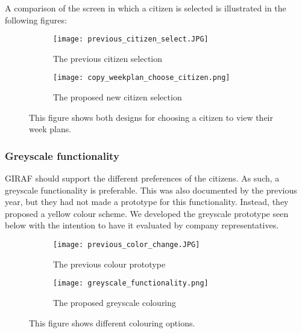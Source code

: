 A comparison of the screen in which a citizen is selected is illustrated in the following figures:
\begin{figure}[H]
    \begin{subfigure}{0.5\textwidth}
    \texttt{[image: previous\_citizen\_select.JPG]} 
    \caption{The previous citizen selection}
    \label{fig:previous_citizen_select}
    \end{subfigure}
    \begin{subfigure}{0.5\textwidth}
        \texttt{[image: copy\_weekplan\_choose\_citizen.png]}
    \caption{The proposed new citizen selection}
    \label{fig:new_citizen_select}
    \end{subfigure} 
    \caption{This figure shows both designs for choosing a citizen to view their week plans.}
    \label{fig:citizen_select}
\end{figure}
\noindent

\subsubsection{Greyscale functionality}
GIRAF should support the different preferences of the citizens. 
As such, a greyscale functionality is preferable.
This was also documented by the previous year, but they had not made a prototype for this functionality.
Instead, they proposed a yellow colour scheme.
We developed the greyscale prototype seen below with the intention to have it evaluated by company representatives.
\begin{figure}[H]
    \begin{subfigure}{0.5\textwidth}
    \texttt{[image: previous\_color\_change.JPG]} 
    \caption{The previous colour prototype}
    \label{fig:previous_greyscale_prototype}
    \end{subfigure}
    \begin{subfigure}{0.5\textwidth}
        \texttt{[image: greyscale\_functionality.png]}
    \caption{The proposed greyscale colouring}
    \label{fig:new_greyscale_prototype}
    \end{subfigure} 
    \caption{This figure shows different colouring options.}
    \label{fig:greyscale_prototype}
\end{figure}



